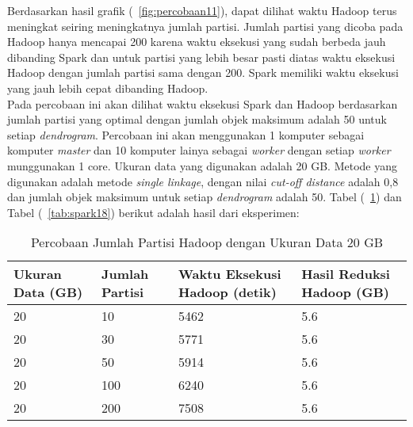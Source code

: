 Berdasarkan hasil grafik (~\ref{fig:percobaan11}), dapat dilihat waktu Hadoop terus meningkat seiring meningkatnya jumlah partisi. Jumlah partisi yang dicoba pada Hadoop hanya mencapai 200 karena waktu eksekusi yang sudah berbeda jauh dibanding Spark dan untuk partisi yang lebih besar pasti diatas waktu eksekusi Hadoop dengan jumlah partisi sama dengan 200. Spark memiliki waktu eksekusi yang jauh lebih cepat dibanding Hadoop.\\




Pada percobaan ini akan dilihat waktu eksekusi Spark dan Hadoop berdasarkan jumlah partisi yang optimal dengan jumlah objek maksimum adalah 50 untuk setiap \textit{dendrogram}. Percobaan ini akan menggunakan 1 komputer sebagai komputer \textit{master} dan 10 komputer lainya sebagai \textit{worker} dengan setiap \textit{worker} munggunakan 1 core. Ukuran data yang digunakan adalah 20 GB. Metode yang digunakan adalah metode \textit{single linkage}, dengan nilai \textit{cut-off distance} adalah 0,8 dan jumlah objek maksimum untuk setiap \textit{dendrogram} adalah 50. Tabel (~\ref{tab:spark17}) dan Tabel (~\ref{tab:spark18}) berikut adalah hasil dari eksperimen:





\begin{table}[H] 
	\centering 
	\caption{Percobaan Jumlah Partisi Hadoop dengan Ukuran Data 20 GB}
	\label{tab:spark17}
	\begin{tabular}{|p{3cm}|p{3cm}|p{4cm}|p{4cm}|}
\hline
Ukuran Data (GB) & Jumlah Partisi &  Waktu Eksekusi Hadoop (detik) & Hasil Reduksi Hadoop (GB)\\
\hline
20 & 10 & 5462  & 5.6  \\
\hline
20 & 30 & 5771  & 5.6  \\
\hline
20 & 50 & 5914  & 5.6  \\
\hline
20 & 100 & 6240  & 5.6  \\
\hline
20 & 200 & 7508 & 5.6  \\
\hline


\hline

	\end{tabular} 
\end{table}





